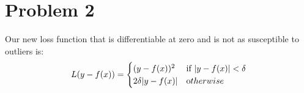 \section*{Problem 2}
Our new loss function that is differentiable at zero and is not as susceptible to outliers is:
\[ L(y-f(x)) = \begin{cases} (y-f(x))^2 & \mbox{if } |y-f(x)| < \delta\\
2\delta |y-f(x)|& \mbox otherwise 
\end{cases} \]